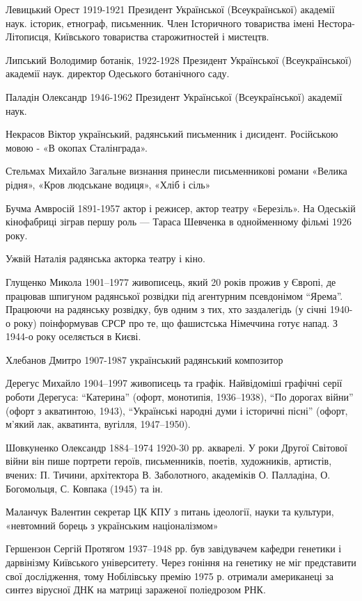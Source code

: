 Левицький Орест 1919-1921 Президент Української (Всеукраїнської) академії наук. історик, етнограф, письменник. Член Історичного товариства імені Нестора-Літописця, Київського товариства старожитностей і мистецтв.

Липський Володимир ботанік, 1922-1928 Президент Української (Всеукраїнської) академії наук. директор Одеського ботанічного саду.

Паладін Олександр 1946-1962 Президент Української (Всеукраїнської) академії наук.

Некрасов Віктор український, радянський письменник і дисидент. Російською мовою - «В окопах Сталінграда».

Стельмах Михайло Загальне визнання принесли письменникові романи «Велика рідня», «Кров людськане водиця», «Хліб і сіль»

Бучма Амвросій 1891-1957 актор і режисер, актор театру «Березіль». На Одеській кінофабриці зіграв першу роль — Тараса Шевченка в однойменному фільмі 1926 року.

Ужвій Наталія радянська акторка театру і кіно.

Глущенко Микола 1901–1977 живописець, який 20 років прожив у Європі, де працював шпигуном радянської розвідки під агентурним псевдонімом “Ярема”. Працюючи на радянську розвідку, був одним з тих, хто заздалегідь (у січні 1940-о року) поінформував СРСР про те, що фашистська Німеччина готує напад. З 1944-о року оселяється в Києві.

Хлебанов Дмитро 1907-1987 український радянський композитор

Дерегус Михайло 1904–1997 живописець та графік. Найвідоміші графічні серії роботи Дерегуса: “Катерина” (офорт, монотипія, 1936–1938), “По дорогах війни” (офорт з акватинтою, 1943), “Українські народні думи і історичні пісні” (офорт, м’який лак, акватинта, вугілля, 1947–1950).

Шовкуненко Олександр 1884–1974 1920-30 рр. акварелі. У роки Другої Світової війни він пише портрети героїв, письменників, поетів, художників, артистів, вчених: П. Тичини, архітектора В. Заболотного, академіків О. Палладіна, О. Богомольця, С. Ковпака (1945) та ін.

Маланчук Валентин секретар ЦК КПУ з питань ідеології, науки та культури, «невтомний борець з українським націоналізмом»

Гершензон Сергій Протягом 1937–1948 рр. був завідувачем кафедри генетики і дарвінізму Київського університету. Через гоніння на генетику не міг представити свої дослідження, тому Нобілівську премію 1975 р. отримали американеці за синтез вірусної ДНК на матриці зараженої поліедрозом РНК.

